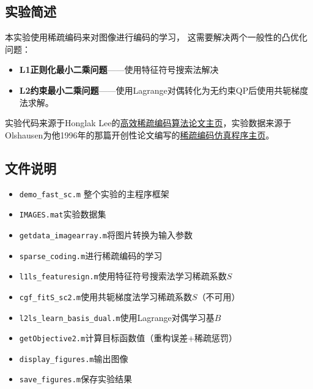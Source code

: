 \subsection*{实验简述}
本实验使用稀疏编码来对图像进行编码的学习，
这需要解决两个一般性的凸优化问题：
\begin{itemize}
\item \textbf{L1正则化最小二乘问题}——使用特征符号搜索法解决
\item \textbf{L2约束最小二乘问题}——使用Lagrange对偶转化为无约束QP后使用共轭梯度法求解。
\end{itemize}

实验代码来源于Honglak Lee的\href{http://ai.stanford.edu/~hllee/softwares/nips06-sparsecoding.htm} {高效稀疏编码算法论文主页}，实验数据来源于Olshausen为他1996年的那篇开创性论文编写的\href{http://www.rctn.org/bruno/sparsenet/}{稀疏编码仿真程序主页}。


\subsection*{文件说明}
\begin{itemize}
\item \texttt{demo\_fast\_sc.m} 整个实验的主程序框架
\item \texttt{IMAGES.mat}实验数据集
\item \texttt{getdata\_imagearray.m}将图片转换为输入参数
\item \texttt{sparse\_coding.m}进行稀疏编码的学习
\item \texttt{l1ls\_featuresign.m}使用特征符号搜索法学习稀疏系数$S$
\item \verb"cgf_fitS_sc2.m"使用共轭梯度法学习稀疏系数$S$（不可用）
\item \verb"l2ls_learn_basis_dual.m"使用Lagrange对偶学习基$B$
\item \verb"getObjective2.m"计算目标函数值（重构误差+稀疏惩罚）
\item \verb"display_figures.m"输出图像
\item \verb"save_figures.m"保存实验结果
\end{itemize}

